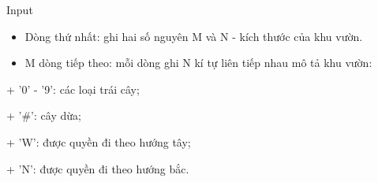 Input
\begin{itemize}
	\item     Dòng thứ nhất: ghi hai số nguyên M và N - kích thước của khu vườn.   
	\item     M dòng tiếp theo: mỗi dòng ghi N kí tự liên tiếp nhau mô tả khu vườn:   
\end{itemize}

   + '0' - '9': các loại trái cây;  

   + '\#': cây dừa;  

   + 'W': được quyền đi theo hướng tây;  

   + 'N': được quyền đi theo hướng bắc.